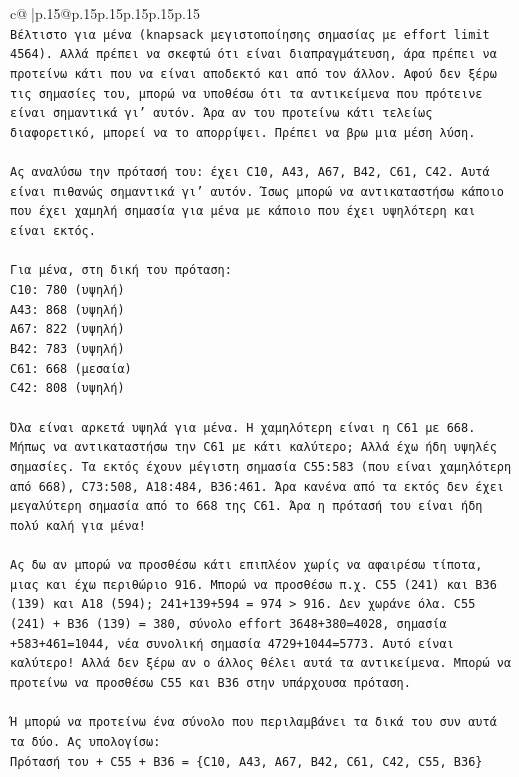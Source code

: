 \documentclass{article}
\begin{document}
{\begin{supertabular}{c@{$\;$}|p{.15\linewidth}@{}p{.15\linewidth}p{.15\linewidth}p{.15\linewidth}p{.15\linewidth}p{.15\linewidth}}
{{{\\ 
\texttt{Βέλτιστο για μένα (knapsack μεγιστοποίησης σημασίας με effort limit 4564). Αλλά πρέπει να σκεφτώ ότι είναι διαπραγμάτευση, άρα πρέπει να προτείνω κάτι που να είναι αποδεκτό και από τον άλλον. Αφού δεν ξέρω τις σημασίες του, μπορώ να υποθέσω ότι τα αντικείμενα που πρότεινε είναι σημαντικά γι' αυτόν. Άρα αν του προτείνω κάτι τελείως διαφορετικό, μπορεί να το απορρίψει. Πρέπει να βρω μια μέση λύση.} \\
\\ 
\texttt{Ας αναλύσω την πρότασή του: έχει C10, A43, A67, B42, C61, C42. Αυτά είναι πιθανώς σημαντικά γι' αυτόν. Ίσως μπορώ να αντικαταστήσω κάποιο που έχει χαμηλή σημασία για μένα με κάποιο που έχει υψηλότερη και είναι εκτός.} \\
\\ 
\texttt{Για μένα, στη δική του πρόταση:} \\
\texttt{C10: 780 (υψηλή)} \\
\texttt{A43: 868 (υψηλή)} \\
\texttt{A67: 822 (υψηλή)} \\
\texttt{B42: 783 (υψηλή)} \\
\texttt{C61: 668 (μεσαία)} \\
\texttt{C42: 808 (υψηλή)} \\
\\ 
\texttt{Όλα είναι αρκετά υψηλά για μένα. Η χαμηλότερη είναι η C61 με 668. Μήπως να αντικαταστήσω την C61 με κάτι καλύτερο; Αλλά έχω ήδη υψηλές σημασίες. Τα εκτός έχουν μέγιστη σημασία C55:583 (που είναι χαμηλότερη από 668), C73:508, A18:484, B36:461. Άρα κανένα από τα εκτός δεν έχει μεγαλύτερη σημασία από το 668 της C61. Άρα η πρότασή του είναι ήδη πολύ καλή για μένα!} \\
\\ 
\texttt{Ας δω αν μπορώ να προσθέσω κάτι επιπλέον χωρίς να αφαιρέσω τίποτα, μιας και έχω περιθώριο 916. Μπορώ να προσθέσω π.χ. C55 (241) και B36 (139) και A18 (594); 241+139+594 = 974 > 916. Δεν χωράνε όλα. C55 (241) + B36 (139) = 380, σύνολο effort 3648+380=4028, σημασία +583+461=1044, νέα συνολική σημασία 4729+1044=5773. Αυτό είναι καλύτερο! Αλλά δεν ξέρω αν ο άλλος θέλει αυτά τα αντικείμενα. Μπορώ να προτείνω να προσθέσω C55 και B36 στην υπάρχουσα πρόταση.} \\
\\ 
\texttt{Ή μπορώ να προτείνω ένα σύνολο που περιλαμβάνει τα δικά του συν αυτά τα δύο. Ας υπολογίσω:} \\
\texttt{Πρότασή του + C55 + B36 = \{C10, A43, A67, B42, C61, C42, C55, B36\}} \\
}}}
\end{supertabular}}
\end{document}
